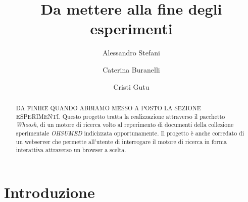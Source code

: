 \documentclass[runningheads]{llncs}
\begin{document}
%
\title{Da mettere alla fine degli esperimenti}
%
%
\author{%
  Alessandro Stefani \and
  Caterina Buranelli \and
  Cristi Gutu}
%
%
%
\maketitle
%
\begin{abstract}
DA FINIRE QUANDO ABBIAMO MESSO A POSTO LA SEZIONE ESPERIMENTI.
Questo progetto tratta la realizzazione attraverso il pacchetto \emph{Whoosh}, di un motore di ricerca
volto al reperimento di documenti della collezione sperimentale \emph{OHSUMED} indicizzata opportunamente.
Il progetto è anche corredato di un webserver che permette all'utente di interrogare il motore di ricerca
in forma interattiva attraverso un browser a scelta.
\end{abstract}

\section{Introduzione}
\label{sec:introduzione}
\end{document}
